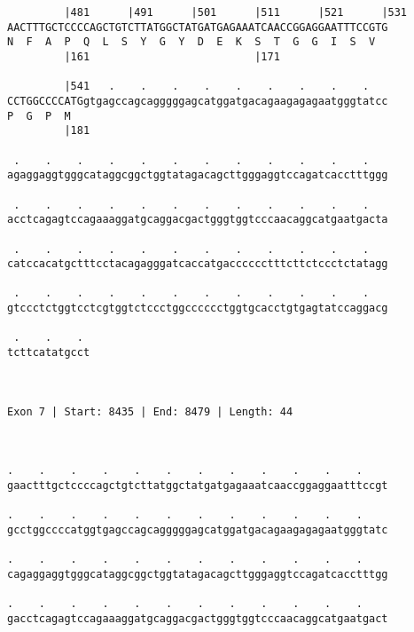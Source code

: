 \documentclass{article}
\begin{document}
\begin{Verbatim}
         |481      |491      |501      |511      |521      |531
AACTTTGCTCCCCAGCTGTCTTATGGCTATGATGAGAAATCAACCGGAGGAATTTCCGTG
N  F  A  P  Q  L  S  Y  G  Y  D  E  K  S  T  G  G  I  S  V  
         |161                          |171                 
  
         |541   .    .    .    .    .    .    .    .    .   
CCTGGCCCCATGgtgagccagcagggggagcatggatgacagaagagagaatgggtatcc
P  G  P  M                                                  
         |181                                               
  
 .    .    .    .    .    .    .    .    .    .    .    .   
agaggaggtgggcataggcggctggtatagacagcttgggaggtccagatcacctttggg
                                                            
 .    .    .    .    .    .    .    .    .    .    .    .   
acctcagagtccagaaaggatgcaggacgactgggtggtcccaacaggcatgaatgacta
                                                            
 .    .    .    .    .    .    .    .    .    .    .    .   
catccacatgctttcctacagagggatcaccatgacccccctttcttctccctctatagg
                                                            
 .    .    .    .    .    .    .    .    .    .    .    .   
gtccctctggtcctcgtggtctccctggcccccctggtgcacctgtgagtatccaggacg
                                                            
 .    .    . 
tcttcatatgcct
             
             
 
Exon 7 | Start: 8435 | End: 8479 | Length: 44



.    .    .    .    .    .    .    .    .    .    .    .    
gaactttgctccccagctgtcttatggctatgatgagaaatcaaccggaggaatttccgt
                                                            
.    .    .    .    .    .    .    .    .    .    .    .    
gcctggccccatggtgagccagcagggggagcatggatgacagaagagagaatgggtatc
                                                            
.    .    .    .    .    .    .    .    .    .    .    .    
cagaggaggtgggcataggcggctggtatagacagcttgggaggtccagatcacctttgg
                                                            
.    .    .    .    .    .    .    .    .    .    .    .    
gacctcagagtccagaaaggatgcaggacgactgggtggtcccaacaggcatgaatgact
                                                            

\end{Verbatim}
\end{document}
